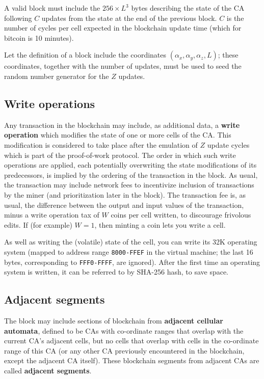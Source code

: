 \documentclass{article}
\newcommand\hex[1]{{\tt #1}}
\newcommand\hexrange[2]{\hex{#1}{\tt -}\hex{#2}}
\begin{document}
A valid block must include the $256 \times L^3$ bytes describing the state of the CA following $C$ updates
from the state at the end of the previous block.
$C$ is the number of cycles per cell expected in the blockchain update time
(which for bitcoin is 10 minutes).

Let the definition of a block include the coordinates $(\alpha_x,\alpha_y,\alpha_z,L)$;
these coordinates, together with the number of updates,
must be used to seed the random number generator for the $Z$ updates.

\subsection{Write operations}

Any transaction in the blockchain may include, as additional data,
a {\bf write operation} which modifies the state of one or more cells of the CA.
This modification is considered to take place after the emulation of $Z$ update cycles
which is part of the proof-of-work protocol.
The order in which such write operations are applied,
each potentially overwriting the state modifications of its predecessors,
is implied by the ordering of the transaction in the block.
As usual, the transaction may include network fees to incentivize inclusion of transactions
by the miner
(and prioritization later in the block).
The transaction fee is, as usual, the difference between the output and input values of the transaction,
minus a write operation tax of $W$ coins per cell written,
to discourage frivolous edits.
If (for example) $W=1$, then minting a coin lets you write a cell.

As well as writing the (volatile) state of the cell, you can write its 32K operating system
(mapped to address range \hexrange{8000}{FFEF} in the virtual machine; the last 16 bytes, corresponding to \hexrange{FFF0}{FFFF}, are ignored).
After the first time an operating system is written, it can be referred to by SHA-256 hash, to save space.

\subsection{Adjacent segments}

The block may include sections of blockchain from {\bf adjacent cellular automata},
defined to be CAs with co-ordinate ranges that
overlap with the current CA's adjacent cells,
but no cells that overlap with
cells in the co-ordinate range of this CA (or any other CA previously encountered in the blockchain,
except the adjacent CA itself).
These blockchain segments from adjacent CAs are called {\bf adjacent segments}.
\end{document}
